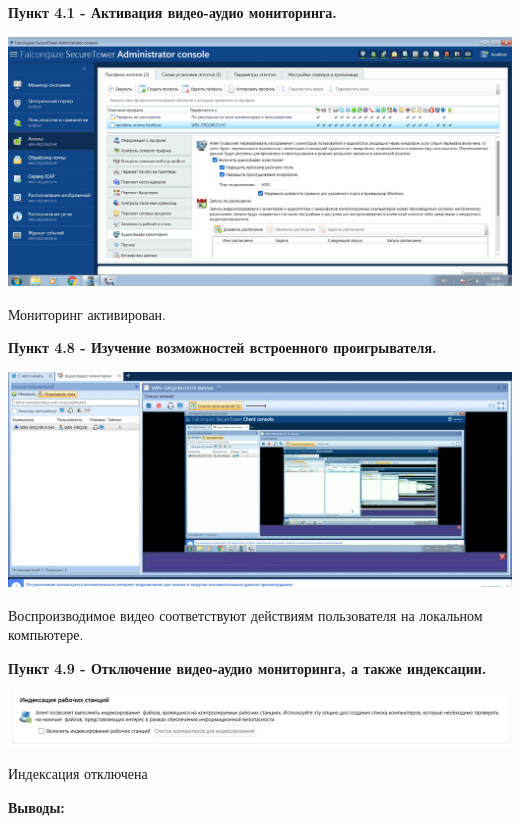 \documentclass[a4paper,14pt]{extarticle}
\begin{document}
    \newpage
    \textbf{Пункт 4.1 -  Активация видео-аудио мониторинга.} 
    \begin{center}
        \includegraphics[scale=0.25]{pics/4.1.jpg}

        Мониторинг активирован.
    \end{center}

    \textbf{Пункт 4.8 - Изучение возможностей встроенного проигрывателя.}
    \begin{center}
        \includegraphics[scale=0.25]{pics/4.8.jpg}

        Воспроизводимое видео соответствуют действиям пользователя на
локальном компьютере.
    \end{center}

    \textbf{Пункт 4.9 - Отключение видео-аудио мониторинга, а также индексации.} 
    \begin{center}
        \includegraphics[scale=0.3]{pics/4.9.jpg}

         Индексация отключена 
    \end{center}

    \newpage
    \textbf{Выводы:}
\end{document}
